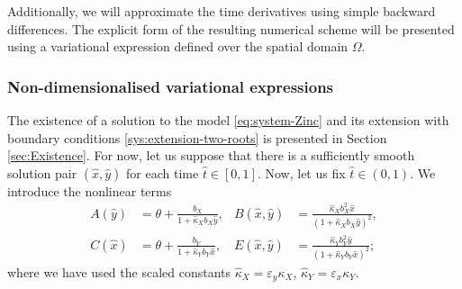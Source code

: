 \documentclass[11pt]{article}
\numberwithin{equation}{section}
\begin{document}

Additionally, we will approximate the time derivatives using simple backward differences. The explicit form of the resulting numerical scheme will be presented using a variational expression defined over the spatial domain \(\Omega\). 




\subsubsection{Non-dimensionalised variational expressions}
\label{sus:non-dim-base}


The existence of a solution to the model \eqref{eq:system-Zinc} and its extension with boundary conditions \eqref{sys:extension-two-roots} is presented in Section \ref{sec:Existence}. 
%
For now, let us suppose that there is a sufficiently smooth solution pair $(\hat x, \hat y)$ for each time \(\hat{t}\in [0,1]\). Now, let us fix \(\hat{t} \in (0,1)\). We introduce the nonlinear terms
\begin{align}
    A(\hat{y}) &= \theta + \frac{b_X}{1 + \hat{\kappa}_X b_X \hat{y}},
    &
    B(\hat{x},\hat{y}) &= \frac{\hat{\kappa}_X b_X^2 \hat{x}}{(1+\hat{\kappa}_X b_X \hat{y})^2},
    \\
    C(\hat{x}) &= \theta + \frac{b_Y}{1 + \hat{\kappa}_Y b_Y \hat{x}},
    &
    E(\hat{x},\hat{y}) &= \frac{\hat{\kappa}_Y b_Y^2 \hat{y}}{(1+\hat{\kappa}_Y b_Y \hat{x})^2};
\end{align}
where we have used the scaled constants \(\hat{\kappa}_X = \varepsilon_y \kappa_X\), \(\hat{\kappa}_Y = \varepsilon_x \kappa_Y\). 
\end{document}
